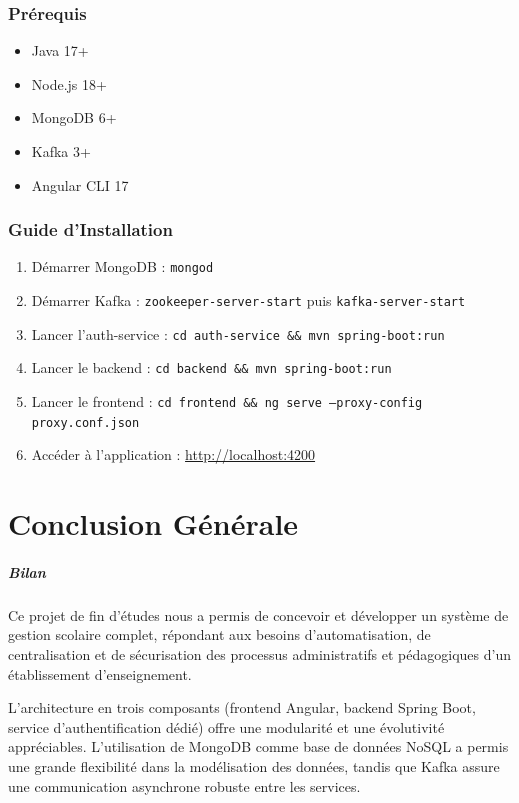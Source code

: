 \documentclass[12pt,a4paper,twoside]{report}
\begin{document}
\subsection{Prérequis}
\begin{itemize}[leftmargin=*]
  \item Java 17+
  \item Node.js 18+
  \item MongoDB 6+
  \item Kafka 3+
  \item Angular CLI 17
\end{itemize}

\subsection{Guide d'Installation}
\begin{enumerate}[leftmargin=*]
  \item Démarrer MongoDB : \texttt{mongod}
  \item Démarrer Kafka : \texttt{zookeeper-server-start} puis \texttt{kafka-server-start}
  \item Lancer l'auth-service : \texttt{cd auth-service \&\& mvn spring-boot:run}
  \item Lancer le backend : \texttt{cd backend \&\& mvn spring-boot:run}
  \item Lancer le frontend : \texttt{cd frontend \&\& ng serve --proxy-config proxy.conf.json}
  \item Accéder à l'application : \url{http://localhost:4200}
\end{enumerate}

\chapter*{Conclusion Générale}

\paragraph{Bilan}
Ce projet de fin d'études nous a permis de concevoir et développer un système de gestion scolaire complet, répondant aux besoins d'automatisation, de centralisation et de sécurisation des processus administratifs et pédagogiques d'un établissement d'enseignement.

L'architecture en trois composants (frontend Angular, backend Spring Boot, service d'authentification dédié) offre une modularité et une évolutivité appréciables. L'utilisation de MongoDB comme base de données NoSQL a permis une grande flexibilité dans la modélisation des données, tandis que Kafka assure une communication asynchrone robuste entre les services.
\end{document}

